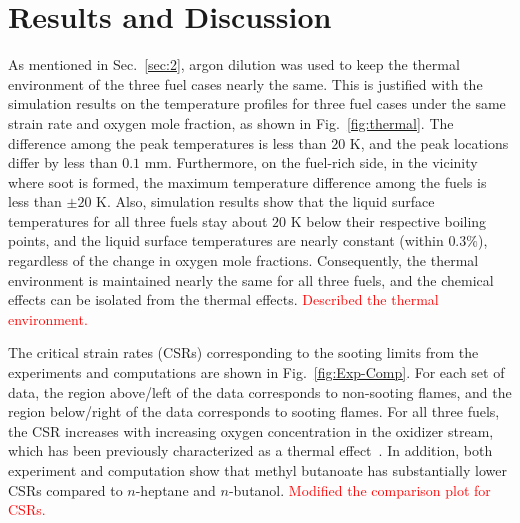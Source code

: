 \documentclass[review,3p,times]{elsarticleUS}
\begin{document}
\section{Results and Discussion}

As mentioned in Sec.~\ref{sec:2}, argon dilution was used to keep the thermal environment of the three fuel cases nearly the same.  This is justified with the simulation results on the temperature profiles for three fuel cases under the same strain rate and oxygen mole fraction, as shown in Fig.~\ref{fig:thermal}.  The difference among the peak temperatures is less than $20$ K, and the peak locations differ by less than $0.1$ mm.  Furthermore, on the fuel-rich side, in the vicinity where soot is formed, the maximum temperature difference among the fuels is less than $\pm20$ K.  Also, simulation results show that the liquid surface temperatures for all three fuels stay about $20$ K below their respective boiling points, and the liquid surface temperatures are nearly constant (within $0.3\%$), regardless of the change in oxygen mole fractions.  Consequently, the thermal environment is maintained nearly the same for all three fuels, and the chemical effects can be isolated from the thermal effects.  \textcolor{red}{Described the thermal environment.}

The critical strain rates (CSRs) corresponding to the sooting limits from the experiments and computations are shown in Fig.~\ref{fig:Exp-Comp}. For each set of data, the region above/left of the data corresponds to non-sooting flames, and the region below/right of the data corresponds to sooting flames. For all three fuels, the CSR increases with increasing oxygen concentration in the oxidizer stream, which has been previously characterized as a thermal effect~\cite{du91}. In addition, both experiment and computation show that methyl butanoate has substantially lower CSRs compared to  $n$-heptane and $n$-butanol.   \textcolor{red}{Modified the comparison plot for CSRs.}
\end{document}
